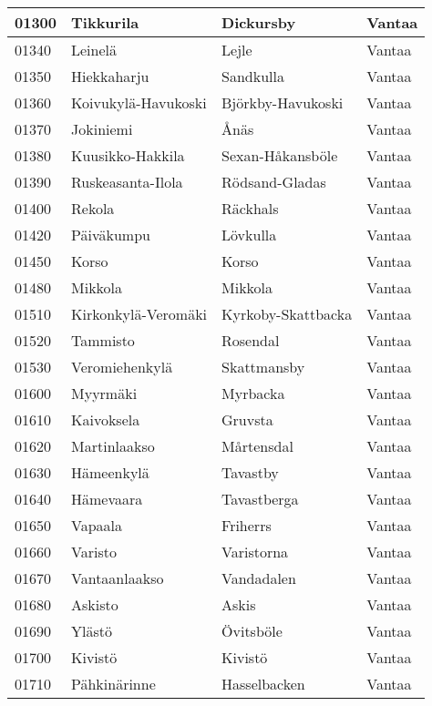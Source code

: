 \begin{longtable}{llll}
    01300 & Tikkurila & Dickursby & Vantaa \\ [0.25ex] \hline
    01340 & Leinelä & Lejle & Vantaa \\ [0.25ex] \hline
    01350 & Hiekkaharju & Sandkulla & Vantaa \\ [0.25ex] \hline
    01360 & Koivukylä-Havukoski & Björkby-Havukoski & Vantaa \\ [0.25ex] \hline
    01370 & Jokiniemi & Ånäs & Vantaa \\ [0.25ex] \hline
    01380 & Kuusikko-Hakkila & Sexan-Håkansböle & Vantaa \\ [0.25ex] \hline
    01390 & Ruskeasanta-Ilola & Rödsand-Gladas & Vantaa \\ [0.25ex] \hline
    01400 & Rekola & Räckhals & Vantaa \\ [0.25ex] \hline
    01420 & Päiväkumpu & Lövkulla & Vantaa \\ [0.25ex] \hline
    01450 & Korso & Korso & Vantaa \\ [0.25ex] \hline
    01480 & Mikkola & Mikkola & Vantaa \\ [0.25ex] \hline
    01510 & Kirkonkylä-Veromäki & Kyrkoby-Skattbacka & Vantaa \\ [0.25ex] \hline
    01520 & Tammisto & Rosendal & Vantaa \\ [0.25ex] \hline
    01530 & Veromiehenkylä & Skattmansby & Vantaa \\ [0.25ex] \hline
    01600 & Myyrmäki & Myrbacka & Vantaa \\ [0.25ex] \hline
    01610 & Kaivoksela & Gruvsta & Vantaa \\ [0.25ex] \hline
    01620 & Martinlaakso & Mårtensdal & Vantaa \\ [0.25ex] \hline
    01630 & Hämeenkylä & Tavastby & Vantaa \\ [0.25ex] \hline
    01640 & Hämevaara & Tavastberga & Vantaa \\ [0.25ex] \hline
    01650 & Vapaala & Friherrs & Vantaa \\ [0.25ex] \hline
    01660 & Varisto & Varistorna & Vantaa \\ [0.25ex] \hline
    01670 & Vantaanlaakso & Vandadalen & Vantaa \\ [0.25ex] \hline
    01680 & Askisto & Askis & Vantaa \\ [0.25ex] \hline
    01690 & Ylästö & Övitsböle & Vantaa \\ [0.25ex] \hline
    01700 & Kivistö & Kivistö & Vantaa \\ [0.25ex] \hline
    01710 & Pähkinärinne & Hasselbacken & Vantaa \\ [0.25ex] \hline

\end{longtable}
